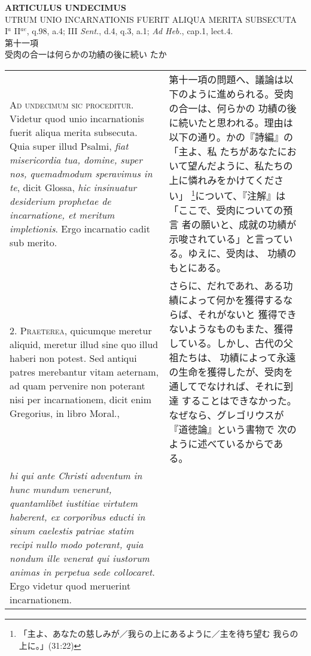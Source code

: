 \documentclass[10pt]{jsarticle} %
\begin{document}
\begin{center}
{\Large {\bf ARTICULUS UNDECIMUS}}\\ {\large UTRUM UNIO INCARNATIONIS
FUERIT ALIQUA MERITA SUBSECUTA}\\ {\footnotesize I$^a$ II$^{ae}$,
q.98, a.4; III {\itshape Sent.}, d.4, q.3, a.1; {\itshape Ad Heb.},
cap.1, lect.4.}\\ {\Large 第十一項\\受肉の合一は何らかの功績の後に続い
たか}
\end{center}

\begin{longtable}{p{21em}p{21em}}


{\Huge A}{\scshape d undecimum sic proceditur}. Videtur quod unio
incarnationis fuerit aliqua merita subsecuta. Quia super illud Psalmi,
{\itshape fiat misericordia tua, domine, super nos, quemadmodum
speravimus in te}, dicit Glossa, {\itshape hic insinuatur desiderium
prophetae de incarnatione, et meritum impletionis}. Ergo incarnatio
cadit sub merito.


&


第十一項の問題へ、議論は以下のように進められる。受肉の合一は、何らかの
功績の後に続いたと思われる。理由は以下の通り。かの『詩編』の「主よ、私
たちがあなたにおいて望んだように、私たちの上に憐れみをかけてください」
\footnote{「主よ、あなたの慈しみが／我らの上にあるように／主を待ち望む
我らの上に。」(31:22)}について、『注解』は「ここで、受肉についての預言
者の願いと、成就の功績が示唆されている」と言っている。ゆえに、受肉は、
功績のもとにある。


\\



2. {\scshape Praeterea}, quicumque meretur aliquid, meretur illud sine
quo illud haberi non potest. Sed antiqui patres merebantur vitam
aeternam, ad quam pervenire non poterant nisi per incarnationem, dicit
enim Gregorius, in libro Moral.,



&

さらに、だれであれ、ある功績によって何かを獲得するならば、それがないと
獲得できないようなものもまた、獲得している。しかし、古代の父祖たちは、
功績によって永遠の生命を獲得したが、受肉を通してでなければ、それに到達
することはできなかった。なぜなら、グレゴリウスが『道徳論』という書物で
次のように述べているからである。


\\

{\itshape hi qui ante Christi adventum in hunc mundum venerunt,
quantamlibet iustitiae virtutem haberent, ex corporibus educti in
sinum caelestis patriae statim recipi nullo modo poterant, quia nondum
ille venerat qui iustorum animas in perpetua sede collocaret}. Ergo
videtur quod meruerint incarnationem.



\end{longtable}
\end{document}
